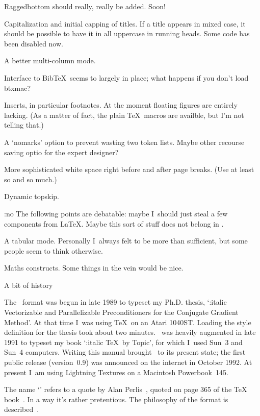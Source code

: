 \Enumerate\item Raggedbottom should really, really be added. Soon!

\item Capitalization and initial capping of titles. If a
title appears in mixed case, it should be possible to have it in all
uppercase in running heads. Some code has been disabled now.

\item A better multi-column mode.

\item Interface to Bib\TeX\ seems to largely in place; what happens
if you don't load btxmac?

\item Inserts, in particular footnotes. At the moment floating
figures are entirely lacking. (As a matter of fact, the plain \TeX\
macros are availble, but I'm not telling that.)

\item A `nomarks' option to prevent wasting two token lists.
Maybe other recourse saving optio for the expert designer?

\item More sophisticated white space right before and after
page breaks. (Use at least so and so much.)

\item Dynamic topskip.

{\PopIndentLevel\Indent:no The following points are debatable:
maybe I~should just steal a few components from \LaTeX. Maybe this
sort of stuff does not belong in \Lollipop.\par}

\item A tabular mode. Personally I~always felt  to be more
than sufficient, but some people seem to think otherwise.

\item Maths constructs. Some things in the  vein would be
nice.

\>

\SubSection A bit of history

The \Lollipop\ format was begun in late 1989 to typeset my Ph.D.
thesis, `{\Style:italic Vectorizable and Parallelizable
Preconditioners for the Conjugate Gradient Method}'. At that time 
I~was using \TeX\ on an Atari 1040ST.
Loading the style definition for the thesis took about two minutes.
\Lollipop\ was heavily augmented in late 1991 to typeset my book
`{\Style:italic \TeX\ by Topic}', for which I~used Sun~3 and Sun~4
computers. Writing this manual brought \Lollipop\ to its present
state; the first public release (version~0.9) was announced on the
internet in October 1992. At present I~am using Lightning Textures on a
Macintosh Powerbook~145.

The name `' refers to a quote by Alan
Perlis~\bibref[Pe:epigrams], quoted on page 365 of the \TeX
book~\bibref[Kn:book]. In a way it's rather pretentious. The philosophy
of the \cs{Lollipop} format is described~\bibref[EL:Cork,E:Portland].

\endinput

92/10/22 historical remark about name added
92/11/03 section 'Lollipop and plain TeX' added;
         remarks about IniTeX in Textures
92/11/26 uses bibrefs
